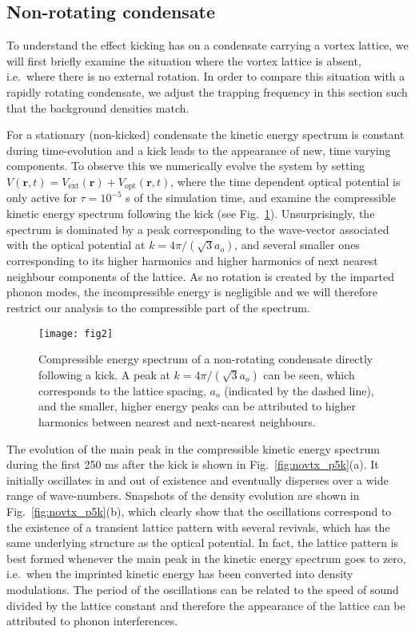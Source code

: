     	\subsection{Non-rotating condensate}

    To understand the effect kicking has on a condensate carrying a vortex lattice, we will first briefly examine the situation where the vortex lattice is absent, i.e.~where there is no external rotation. In order to compare this situation with a rapidly rotating condensate, we adjust the trapping frequency in this section such that the background densities match.

    For a stationary (non-kicked) condensate the kinetic energy spectrum is constant during time-evolution and a kick leads to the appearance of new, time varying components. To observe this we numerically evolve the system by setting $V(\mathbf{r},t) = V_\text{ext}(\mathbf{r}) + V_\text{opt}(\mathbf{r},t)$, where the time dependent optical potential is only active for $\tau=10^{-5}$ s of the simulation time, and examine the compressible kinetic energy spectrum following the kick (see Fig.~\ref{fig:ekc_eki_novtx}). Unsurprisingly, the spectrum is dominated by a peak corresponding to the wave-vector associated with the optical potential at $k=4\pi/(\sqrt{3}a_o)$, and several smaller ones corresponding to its higher harmonics and higher harmonics of next nearest neighbour components of the lattice. As no rotation is created by the imparted phonon modes, the incompressible energy is negligible and we will therefore restrict our analysis to the compressible part of the spectrum.

    		\begin{figure}[tb]
    			\texttt{[image: fig2]}
    			\caption{Compressible energy spectrum of a non-rotating condensate directly following a kick. A peak at $k=4\pi/(\sqrt{3}a_o)$ can be seen, which corresponds to the  lattice spacing, $a_o$ (indicated by the dashed line), and the smaller, higher energy peaks can be attributed to higher harmonics between nearest and next-nearest neighbours. }
    			\label{fig:ekc_eki_novtx}
    		\end{figure}

    The evolution of the main peak in the compressible kinetic energy spectrum during the first 250 ms after the kick is shown in Fig.~\ref{fig:novtx_p5k}(a). It initially oscillates in and out of existence and eventually disperses over a wide range of wave-numbers. Snapshots of the density evolution are shown in Fig.~\ref{fig:novtx_p5k}(b), which clearly show that the oscillations correspond to the existence of a transient lattice pattern with several revivals, which has the same underlying structure as the optical potential. In fact, the lattice pattern is best formed whenever the main peak in the kinetic energy spectrum goes to zero, i.e.~when the imprinted kinetic energy has been converted into density modulations. The period of the oscillations can be related to the speed of sound divided by the lattice constant and therefore the appearance of the lattice can be attributed to phonon interferences.

